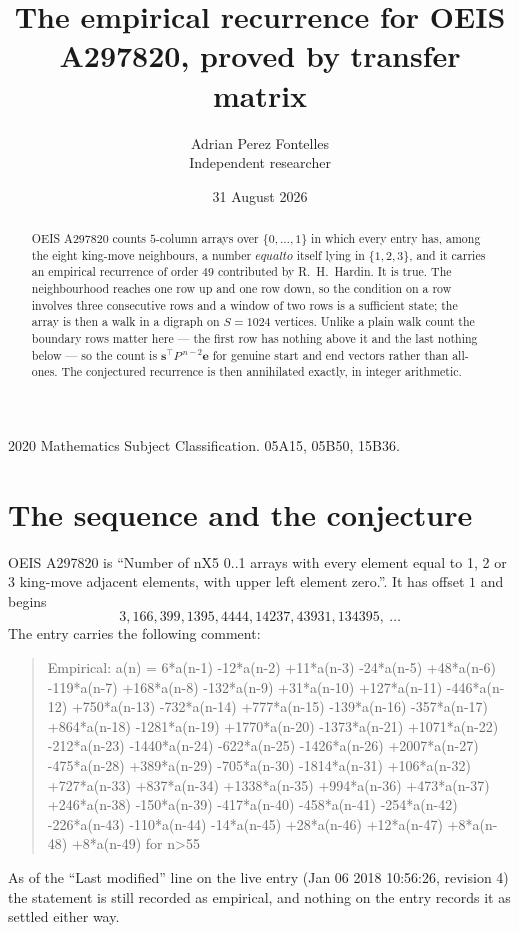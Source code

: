 \documentclass[11pt,a4paper]{article}
\title{The empirical recurrence for OEIS A297820, proved by transfer matrix}
\author{Adrian Perez Fontelles\\ \small Independent researcher}
\date{31 August 2026}
\theoremstyle{plain}
\theoremstyle{definition}
\begin{document}
\maketitle

\begin{abstract}
OEIS A297820 counts $5$-column arrays over $\{0,\dots,1\}$ in which every entry has,
among the eight king-move neighbours, a number $equal to$ itself lying in $\{1,2,3\}$, and it carries an empirical
recurrence of order $49$ contributed by R.~H.~Hardin. It is true. The neighbourhood
reaches one row up and one row down, so the condition on a row involves three consecutive
rows and a window of two rows is a sufficient state; the array is then a walk in a digraph
on $S=1024$ vertices. Unlike a plain walk count the boundary rows matter here --- the first
row has nothing above it and the last nothing below --- so the count is
$\mathbf{s}^{\!\top}P^{\,n-2}\mathbf{e}$ for genuine start and end vectors rather than
all-ones. The conjectured recurrence is then annihilated exactly, in integer arithmetic.
\end{abstract}

\noindent\small 2020 Mathematics Subject Classification. 05A15, 05B50, 15B36.\normalsize

\section{The sequence and the conjecture}

OEIS A297820 is ``Number of nX5 0..1 arrays with every element equal to 1, 2 or 3 king-move adjacent elements, with upper left element zero.''. It has offset
$1$ and begins
\[
3, 166, 399, 1395, 4444, 14237, 43931, 134395,\ \dots
\]
The entry carries the following comment:
\begin{quote}\small
Empirical: a(n) = 6*a(n-1) -12*a(n-2) +11*a(n-3) -24*a(n-5) +48*a(n-6) -119*a(n-7) +168*a(n-8) -132*a(n-9) +31*a(n-10) +127*a(n-11) -446*a(n-12) +750*a(n-13) -732*a(n-14) +777*a(n-15) -139*a(n-16) -357*a(n-17) +864*a(n-18) -1281*a(n-19) +1770*a(n-20) -1373*a(n-21) +1071*a(n-22) -212*a(n-23) -1440*a(n-24) -622*a(n-25) -1426*a(n-26) +2007*a(n-27) -475*a(n-28) +389*a(n-29) -705*a(n-30) -1814*a(n-31) +106*a(n-32) +727*a(n-33) +837*a(n-34) +1338*a(n-35) +994*a(n-36) +473*a(n-37) +246*a(n-38) -150*a(n-39) -417*a(n-40) -458*a(n-41) -254*a(n-42) -226*a(n-43) -110*a(n-44) -14*a(n-45) +28*a(n-46) +12*a(n-47) +8*a(n-48) +8*a(n-49) for n>55
\end{quote}
As of the ``Last modified'' line on the live entry (Jan 06 2018 10:56:26, revision
4) the statement is still recorded as empirical, and nothing on the entry
records it as settled either way.
\end{document}
